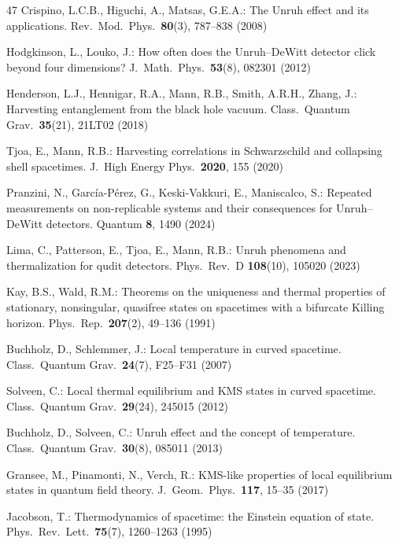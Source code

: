 \begin{thebibliography}{47}
Crispino, L.C.B., Higuchi, A., Matsas, G.E.A.:
The Unruh effect and its applications.
Rev.\ Mod.\ Phys.\ \textbf{80}(3), 787--838 (2008)

Hodgkinson, L., Louko, J.:
How often does the Unruh--DeWitt detector click beyond four dimensions?
J.\ Math.\ Phys.\ \textbf{53}(8), 082301 (2012)

Henderson, L.J., Hennigar, R.A., Mann, R.B., Smith, A.R.H., Zhang, J.:
Harvesting entanglement from the black hole vacuum.
Class.\ Quantum Grav.\ \textbf{35}(21), 21LT02 (2018)

Tjoa, E., Mann, R.B.:
Harvesting correlations in Schwarzschild and collapsing shell spacetimes.
J.\ High Energy Phys.\ \textbf{2020}, 155 (2020)

Pranzini, N., Garc\'ia-P\'erez, G., Keski-Vakkuri, E., Maniscalco, S.:
Repeated measurements on non-replicable systems and their consequences for Unruh--DeWitt detectors.
Quantum \textbf{8}, 1490 (2024)

Lima, C., Patterson, E., Tjoa, E., Mann, R.B.:
Unruh phenomena and thermalization for qudit detectors.
Phys.\ Rev.\ D \textbf{108}(10), 105020 (2023)


Kay, B.S., Wald, R.M.:
Theorems on the uniqueness and thermal properties of stationary, nonsingular, quasifree states on spacetimes with a bifurcate Killing horizon.
Phys.\ Rep.\ \textbf{207}(2), 49--136 (1991)

Buchholz, D., Schlemmer, J.:
Local temperature in curved spacetime.
Class.\ Quantum Grav.\ \textbf{24}(7), F25--F31 (2007)

Solveen, C.:
Local thermal equilibrium and KMS states in curved spacetime.
Class.\ Quantum Grav.\ \textbf{29}(24), 245015 (2012)

Buchholz, D., Solveen, C.:
Unruh effect and the concept of temperature.
Class.\ Quantum Grav.\ \textbf{30}(8), 085011 (2013)

Gransee, M., Pinamonti, N., Verch, R.:
KMS-like properties of local equilibrium states in quantum field theory.
J.\ Geom.\ Phys.\ \textbf{117}, 15--35 (2017)

Jacobson, T.:
Thermodynamics of spacetime: the Einstein equation of state.
Phys.\ Rev.\ Lett.\ \textbf{75}(7), 1260--1263 (1995)


\end{thebibliography}
